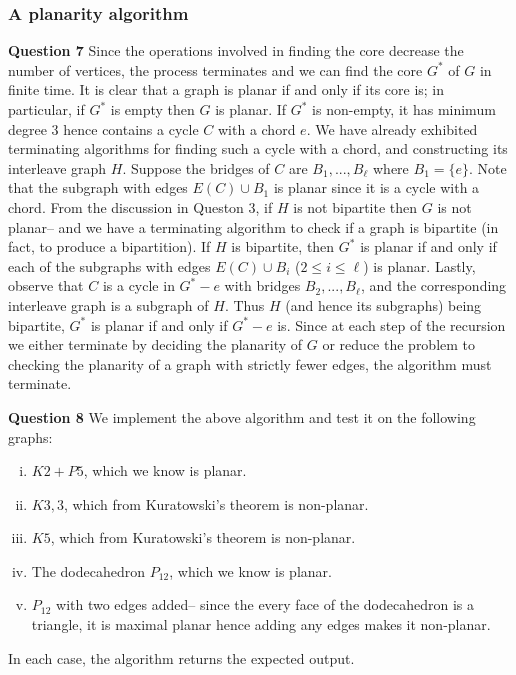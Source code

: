 \documentclass[12pt]{article}
\begin{document}
\subsubsection{A planarity algorithm}
\textbf{Question 7}\quad 
Since the operations involved in finding the core decrease the number of
vertices, the process terminates and we can find the core \(G^\ast\) of \(G\) in
finite time. It is clear that a graph is planar if and only if its core is; in
particular, if \(G^\ast\) is empty then \(G\) is planar. If \(G^\ast\) is
non-empty, it has minimum degree \(3\) hence contains a cycle \(C\) with a chord
\(e\). We have already exhibited terminating algorithms for finding such a
cycle with a chord, and constructing its interleave graph \(H\). Suppose the
bridges of \(C\) are \(B_1,...,B_\ell\) where \(B_1=\{e\}\). Note that the
subgraph with edges \(E(C)\cup B_1\) is planar since it is a cycle with a chord.
From the discussion in Queston 3, if \(H\) is not bipartite then \(G\) is not
planar-- and we have a terminating algorithm to check if a graph is bipartite (in fact,
to produce a bipartition). If \(H\) is bipartite, then \(G^\ast\) is planar if and
only if each of the subgraphs with edges \(E(C)\cup B_i\) (\(2\leq i \leq
\ell\)) is planar. Lastly, observe that \(C\) is a  cycle in \(G^\ast - e\) with
bridges \(B_2,...,B_\ell\), and the corresponding interleave graph is a subgraph
of \(H\). Thus \(H\) (and hence its subgraphs) being bipartite, \(G^\ast\) is
planar if and only if \(G^\ast - e\) is.
Since at each step of the recursion we either terminate by deciding the
planarity of \(G\) or reduce the problem to checking the planarity of a graph with strictly
fewer edges, the algorithm must terminate.

\textbf{Question 8}\quad 
We implement the above algorithm and test it on the following graphs: 
\begin{enumerate}[(i)]
    \item \(K2+P5\), which we know is planar.
    \item \(K3,3\), which from Kuratowski's theorem is non-planar.
    \item \(K5\), which from Kuratowski's theorem is non-planar.
    \item The dodecahedron \(P_{12}\), which we know is planar.
    \item \(P_{12}\) with two edges added-- since the every face of the
        dodecahedron is a triangle, it is maximal planar hence adding any edges
        makes it non-planar.
\end{enumerate}
In each case, the algorithm returns the expected output.
\end{document}
